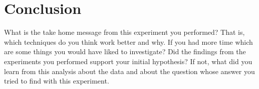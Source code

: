 \section{Conclusion}
What is the take home message from this experiment you performed? That is, which techniques do you think work better and why. If you had more time which are some things you would have liked to investigate? Did the 
findings from the experiments you performed support your initial hypothesis? If not, what did you learn from this analysis about the data and about the question whose answer you tried to find with this experiment. 